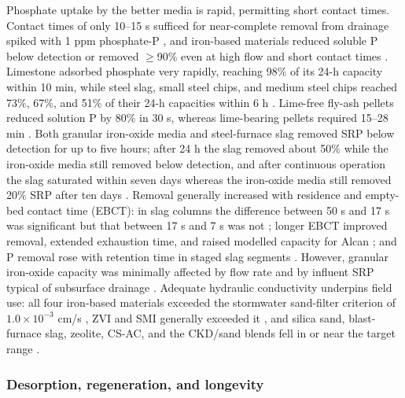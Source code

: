Phosphate uptake by the better media is rapid, permitting short contact times. Contact times of only 10--15 s sufficed for near-complete removal from drainage spiked with 1 ppm phosphate-P \parencite{Allred2017}, and iron-based materials reduced soluble P below detection or removed $\geq$90\% even at high flow and short contact times \parencite{Allred2014}. Limestone adsorbed phosphate very rapidly, reaching 98\% of its 24-h capacity within 10 min, while steel slag, small steel chips, and medium steel chips reached 73\%, 67\%, and 51\% of their 24-h capacities within 6 h \parencite{Sellner2019b}. Lime-free fly-ash pellets reduced solution P by 80\% in 30 s, whereas lime-bearing pellets required 15--28 min \parencite{Li2017}. Both granular iron-oxide media and steel-furnace slag removed SRP below detection for up to five hours; after 24 h the slag removed about 50\% while the iron-oxide media still removed below detection, and after continuous operation the slag saturated within seven days whereas the iron-oxide media still removed 20\% SRP after ten days \parencite{Hauda2020}. Removal generally increased with residence and empty-bed contact time (EBCT): in slag columns the difference between 50 s and 17 s was significant but that between 17 s and 7 s was not \parencite{Sanford2016}; longer EBCT improved removal, extended exhaustion time, and raised modelled capacity for Alcan \parencite{Kumari2025}; and P removal rose with retention time in staged slag segments \parencite{Wang2020d}. However, granular iron-oxide capacity was minimally affected by flow rate and by influent SRP typical of subsurface drainage \parencite{Hauda2020}. Adequate hydraulic conductivity underpins field use: all four iron-based materials exceeded the stormwater sand-filter criterion of $1.0\times10^{-3}$ cm/s \parencite{Allred2014}, ZVI and SMI generally exceeded it \parencite{Allred2012}, and silica sand, blast-furnace slag, zeolite, CS-AC, and the CKD/sand blends fell in or near the target range \parencite{Agrawal2011}.

\subsubsection{Desorption, regeneration, and longevity}

